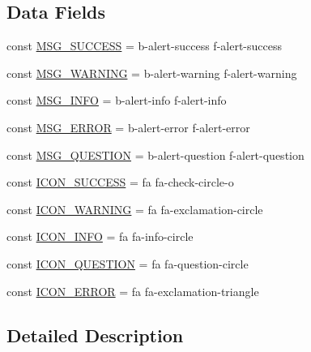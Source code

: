 \subsection*{Data Fields}
\begin{DoxyCompactItemize}
\item 
const \hyperlink{class_admin_render_ad2de921aed88f59ee0e7ef3b57d9b01d}{M\+S\+G\+\_\+\+S\+U\+C\+C\+E\+SS} = \textquotesingle{}b-\/alert-\/success f-\/alert-\/success\textquotesingle{}
\item 
const \hyperlink{class_admin_render_ae42a019cc5ee2ff36752245ca77b11fe}{M\+S\+G\+\_\+\+W\+A\+R\+N\+I\+NG} = \textquotesingle{}b-\/alert-\/warning f-\/alert-\/warning\textquotesingle{}
\item 
const \hyperlink{class_admin_render_a02286f1780bd1d7d0cbec40e529b5a30}{M\+S\+G\+\_\+\+I\+N\+FO} = \textquotesingle{}b-\/alert-\/info f-\/alert-\/info\textquotesingle{}
\item 
const \hyperlink{class_admin_render_a19dfc9e8541d4f7d53a4b5b2859d6336}{M\+S\+G\+\_\+\+E\+R\+R\+OR} = \textquotesingle{}b-\/alert-\/error f-\/alert-\/error\textquotesingle{}
\item 
const \hyperlink{class_admin_render_a248ddaffea888e0fb81e6da920f2852e}{M\+S\+G\+\_\+\+Q\+U\+E\+S\+T\+I\+ON} = \textquotesingle{}b-\/alert-\/question f-\/alert-\/question\textquotesingle{}
\item 
const \hyperlink{class_admin_render_ad3a3fc087598f8685f6c2b964dbb0134}{I\+C\+O\+N\+\_\+\+S\+U\+C\+C\+E\+SS} = \textquotesingle{}fa fa-\/check-\/circle-\/o\textquotesingle{}
\item 
const \hyperlink{class_admin_render_a2730d522cee64630f3f37de77145144f}{I\+C\+O\+N\+\_\+\+W\+A\+R\+N\+I\+NG} = \textquotesingle{}fa fa-\/exclamation-\/circle\textquotesingle{}
\item 
const \hyperlink{class_admin_render_a5a486debdde55040589c5519f40232ee}{I\+C\+O\+N\+\_\+\+I\+N\+FO} = \textquotesingle{}fa fa-\/info-\/circle\textquotesingle{}
\item 
const \hyperlink{class_admin_render_ab9d77c8434a4626fa1c08cadb47b2b00}{I\+C\+O\+N\+\_\+\+Q\+U\+E\+S\+T\+I\+ON} = \textquotesingle{}fa fa-\/question-\/circle\textquotesingle{}
\item 
const \hyperlink{class_admin_render_a4faf332ca4e6c4da3e4204d09382fdb9}{I\+C\+O\+N\+\_\+\+E\+R\+R\+OR} = \textquotesingle{}fa fa-\/exclamation-\/triangle\textquotesingle{}
\end{DoxyCompactItemize}


\subsection{Detailed Description}


